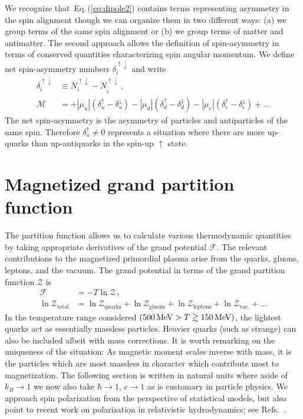 \documentclass[epjST]{svjour}
\newcommand*{\MeV}{\text{\,MeV}}
\newcommand{\req}[1]{Eq.\,(\ref{#1})}
\begin{document}
We recognize that~\req{eq:dipole2} contains terms representing asymmetry in the spin alignment though we can organize them in two different ways: (a) we group terms of the same spin alignment or (b) we group terms of matter and antimatter. The second approach allows the definition of spin-asymmetry in terms of conserved quantities characterizing spin angular momentum. We define net spin-asymmetry numbers $\delta_{i}^{\uparrow\downarrow}$ and write
\begin{align}
\delta_{i}^{\uparrow\downarrow} &\equiv N_{i}^{\uparrow\downarrow}-N_{\bar{i}}^{\uparrow\downarrow}\,,\\
\mathcal{M} &= 
+|\mu_{u}|(\delta_{u}^{\uparrow}-\delta_{u}^{\downarrow})
-|\mu_{d}|(\delta_{d}^{\uparrow}-\delta_{d}^{\downarrow})
-|\mu_{e}|(\delta_{e}^{\uparrow}-\delta_{e}^{\downarrow})+\ldots
\end{align}
The net spin-asymmetry is the asymmetry of particles and antiparticles of the same spin. Therefore $\delta_{u}^{\uparrow}\neq0$ represents a situation where there are more up-quarks than up-antiquarks in the spin-up $\uparrow$ state.

\section{Magnetized grand partition function}
\label{sec:partition}
The partition function allows us to calculate various thermodynamic quantities by taking appropriate derivatives of the grand potential $\mathcal{F}$. The relevant contributions to the magnetized primordial plasma arise from the quarks, gluons, leptons, and the vacuum. The grand potential in terms of the grand partition function $\mathcal{Z}$ is
\begin{align}
\label{eq:parts}
\mathcal{F} &= -T\ln\mathcal{Z}\,,\\
\ln\mathcal{Z}_{\mathrm{total}} &=
\ln\mathcal{Z}_{\mathrm{quarks}} +
\ln\mathcal{Z}_{\mathrm{gluons}} +
\ln\mathcal{Z}_{\mathrm{leptons}}+
\ln\mathcal{Z}_{\mathrm{vac.}}+\ldots 
\end{align}
In the temperature range considered $(500\MeV>T\gtrsim150\MeV)$, the lightest quarks act as essentially massless particles. Heavier quarks (such as strange) can also be included albeit with mass corrections. It is worth remarking on the uniqueness of the situation: As magnetic moment scales inverse with mass, it is the particles which are most massless in character which contribute most to magnetization. The following section is written in natural units {\color{blue} where aside of \(k_{B}\to 1\) we now also take \(\hbar\to 1,\,c\to 1\) as is customary in particle physics. We approach spin polarization from the perspective of statistical models, but also point to recent work on polarization in relativistic hydrodynamics; see Refs.~\cite{Florkowski:2024cif,Bhadury:2024whs,Becattini:2024uha,Singh:2024cub}.}
\end{document}

